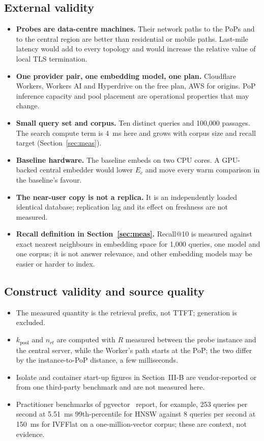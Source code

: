 \documentclass[conference]{IEEEtran}
\begin{document}
\subsection{External validity}
\begin{itemize}
\item \textbf{Probes are data-centre machines.} Their network paths to the PoPs and to the central
region are better than residential or mobile paths. Last-mile latency would add to every topology
and would increase the relative value of local TLS termination.
\item \textbf{One provider pair, one embedding model, one plan.} Cloudflare Workers, Workers AI and
Hyperdrive on the free plan, AWS for origins. PoP inference capacity and pool placement are
operational properties that may change.
\item \textbf{Small query set and corpus.} Ten distinct queries and 100{,}000 passages. The search
compute term is 4~ms here and grows with corpus size and recall target
(Section~\ref{sec:meas}).
\item \textbf{Baseline hardware.} The baseline embeds on two CPU cores. A GPU-backed central
embedder would lower $E_c$ and move every warm comparison in the baseline's favour.
\item \textbf{The near-user copy is not a replica.} It is an independently loaded identical
database; replication lag and its effect on freshness are not measured.
\item \textbf{Recall definition in Section~\ref{sec:meas}.} Recall@10 is measured against exact
nearest neighbours in embedding space for 1{,}000 queries, one model and one corpus; it is not
answer relevance, and other embedding models may be easier or harder to index.
\end{itemize}

\subsection{Construct validity and source quality}
\begin{itemize}
\item The measured quantity is the retrieval prefix, not TTFT; generation is excluded.
\item $k_{\mathrm{pool}}$ and $n_{rt}$ are computed with $R$ measured between the probe instance
and the central server, while the Worker's path starts at the PoP; the two differ by the
instance-to-PoP distance, a few milliseconds.
\item Isolate and container start-up figures in Section~III-B are vendor-reported or from one
third-party benchmark and are not measured here.
\item Practitioner benchmarks of pgvector~\cite{katz2024} report, for example, 253 queries per
second at 5.51~ms 99th-percentile for HNSW against 8 queries per second at 150~ms for IVFFlat on a
one-million-vector corpus; these are context, not evidence.
\end{itemize}
\end{document}
